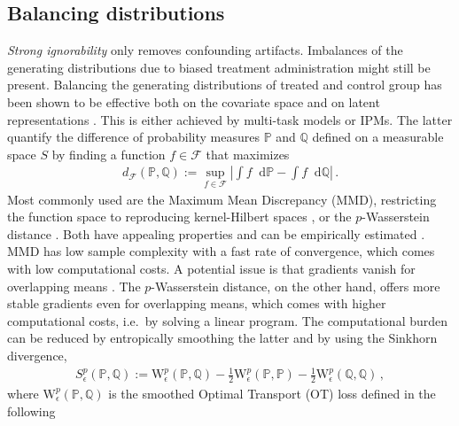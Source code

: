 \documentclass{article}
\renewcommand{\d}{\;\mathrm{d}}
\begin{document}
	
	\subsection{Balancing distributions}
	\textit{Strong ignorability} only removes confounding artifacts. Imbalances of the generating distributions due to biased treatment administration might still be present.
	Balancing the generating distributions of treated and control group has been shown to be effective both on the covariate space \cite{Imai.2014} and on latent representations \cite{Johansson.2016,Shalit.2016,Li.2017,Yao.2018,Huang.2016,Johansson.2020,Lu.2020,DAmour.2017}. This is either achieved by multi-task models or IPMs. The latter quantify the difference of probability measures $\mathbb{P}$ and $\mathbb{Q}$ defined on a measurable space $S$ by finding a function $f\in \mathcal{F}$ that maximizes \cite{Muller.1991}
	\begin{align*}
	d_\mathcal{F}(\mathbb{P},\mathbb{Q}):=\sup_{f\in \mathcal{F}}\left|\int f \; \d \mathbb{P}-\int f \; \d \mathbb{Q}\right| \,.
	\end{align*}
	Most commonly used are the Maximum Mean Discrepancy (MMD), restricting the function space to reproducing kernel-Hilbert spaces \cite{Gretton.2012}, or the $p$-Wasserstein distance \cite{Ramdas.2017}. Both have appealing properties and can be empirically estimated \cite{Sriperumbudur.2012}. MMD has low sample complexity  with a fast rate of convergence, which comes with low computational costs. A potential issue is that gradients vanish for overlapping means \cite{Feydy.2018}.
	The $p$-Wasserstein distance, on the other hand, offers more stable gradients even for overlapping means, which comes with higher computational costs, i.e.~by solving a linear program.
	The computational burden can be reduced by entropically smoothing the latter and by using the Sinkhorn divergence,
	\begin{align*}
	S_\epsilon^p(\mathbb{P},\mathbb{Q}):=\text{W}_\epsilon^p(\mathbb{P},\mathbb{Q})-\frac{1}{2}\text{W}_\epsilon^p(\mathbb{P},\mathbb{P})-\frac{1}{2}\text{W}_\epsilon^p(\mathbb{Q},\mathbb{Q})\,,
	\end{align*}
	where $\text{W}_\epsilon^p(\mathbb{P},\mathbb{Q})$ is the smoothed Optimal Transport (OT) loss defined in the following \cite{Ramdas.2017,Feydy.2018}
\end{document}
